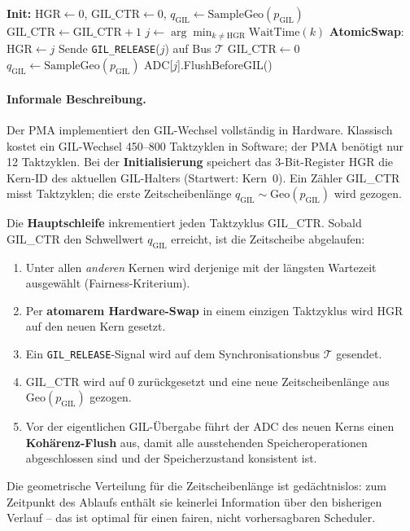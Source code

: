 ﻿\documentclass[a4paper,12pt]{scrreprt}
\theoremstyle{definition}
\begin{document}
	\begin{algorithm}[H]
		\caption{Python Memory Accelerator (PMA) -- GIL-Scheduling}
		\label{alg:pma_gil}
		\begin{algorithmic}[1]
			\State \textbf{Init:} $\mathrm{HGR} \gets 0$, $\mathrm{GIL\_CTR} \gets 0$,
			$q_{\mathrm{GIL}} \gets \mathrm{SampleGeo}(p_{\mathrm{GIL}})$
			\Repeat
			\State $\mathrm{GIL\_CTR} \gets \mathrm{GIL\_CTR} + 1$
			\State $j \gets \arg\min_{k \ne \mathrm{HGR}} \mathrm{WaitTime}(k)$
			\State \textbf{AtomicSwap}: $\mathrm{HGR} \gets j$
			\State Sende \texttt{GIL\_RELEASE}($j$) auf Bus $\mathcal{T}$
			\State $\mathrm{GIL\_CTR} \gets 0$
			\State $q_{\mathrm{GIL}} \gets \mathrm{SampleGeo}(p_{\mathrm{GIL}})$
			\State ADC[$j$].FlushBeforeGIL() 
			\EndIf
		\end{algorithmic}
	\end{algorithm}

	\paragraph{Informale Beschreibung.}
	Der PMA implementiert den GIL-Wechsel vollständig in Hardware.
	Klassisch kostet ein GIL-Wechsel 450--800 Taktzyklen in Software; der PMA benötigt nur 12 Taktzyklen.
	Bei der \textbf{Initialisierung} speichert das 3-Bit-Register HGR die Kern-ID des aktuellen GIL-Halters
	(Startwert: Kern~0). Ein Zähler GIL\_CTR misst Taktzyklen; die erste Zeitscheibenlänge
	$q_{\mathrm{GIL}} \sim \mathrm{Geo}(p_{\mathrm{GIL}})$ wird gezogen.

	Die \textbf{Hauptschleife} inkrementiert jeden Taktzyklus GIL\_CTR.
	Sobald GIL\_CTR den Schwellwert $q_{\mathrm{GIL}}$ erreicht, ist die Zeitscheibe abgelaufen:
	\begin{enumerate}[noitemsep]
		\item Unter allen \emph{anderen} Kernen wird derjenige mit der längsten Wartezeit ausgewählt
			(Fairness-Kriterium).
		\item Per \textbf{atomarem Hardware-Swap} in einem einzigen Taktzyklus wird HGR auf den neuen Kern
			gesetzt.
		\item Ein \texttt{GIL\_RELEASE}-Signal wird auf dem Synchronisationsbus $\mathcal{T}$ gesendet.
		\item GIL\_CTR wird auf 0 zurückgesetzt und eine neue Zeitscheibenlänge aus $\mathrm{Geo}(p_{\mathrm{GIL}})$
			gezogen.
		\item Vor der eigentlichen GIL-Übergabe führt der ADC des neuen Kerns einen \textbf{Kohärenz-Flush}
			aus, damit alle ausstehenden Speicheroperationen abgeschlossen sind und der Speicherzustand
			konsistent ist.
	\end{enumerate}
	Die geometrische Verteilung für die Zeitscheibenlänge ist gedächtnislos: zum Zeitpunkt des Ablaufs
	enthält sie keinerlei Information über den bisherigen Verlauf -- das ist optimal für einen fairen,
	nicht vorhersagbaren Scheduler.
\end{document}
